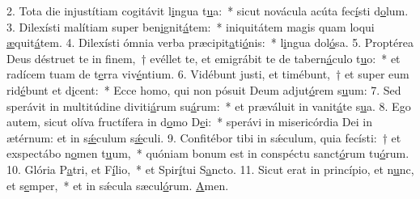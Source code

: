 2. Tota die injustítiam cogitávit l\uline{i}ngua t\uline{u}a:~* sicut novácula acúta fec\uline{í}sti d\uline{o}lum.
3. Dilexísti malítiam super ben\uline{i}gnit\uline{á}tem:~* iniquitátem magis quam loqui \uline{æ}quit\uline{á}tem.
4. Dilexísti ómnia verba præcipit\uline{a}ti\uline{ó}nis:~* l\uline{i}ngua dol\uline{ó}sa.
5. Proptérea Deus déstruet te in finem,~† evéllet te, et emigrábit te de tabern\uline{á}culo t\uline{u}o:~* et radícem tuam de t\uline{e}rra viv\uline{é}ntium.
6. Vidébunt justi, et timébunt,~† et super eum rid\uline{é}bunt et d\uline{i}cent:~* Ecce homo, qui non pósuit Deum adjut\uline{ó}rem s\uline{u}um:
7. Sed sperávit in multitúdine diviti\uline{á}rum su\uline{á}rum:~* et præváluit in vanit\uline{á}te s\uline{u}a.
8. Ego autem, sicut olíva fructífera in d\uline{o}mo D\uline{e}i:~* sperávi in misericórdia Dei in ætérnum: et in s\uline{ǽ}culum s\uline{ǽ}culi.
9. Confitébor tibi in sǽculum, quia fecísti:~† et exspectábo n\uline{o}men t\uline{u}um,~* quóniam bonum est in conspéctu sanct\uline{ó}rum tu\uline{ó}rum.
10. Glória P\uline{a}tri, et F\uline{í}lio,~* et Spir\uline{í}tui S\uline{a}ncto.
11. Sicut erat in princípio, et n\uline{u}nc, et s\uline{e}mper,~* et in sǽcula sæcul\uline{ó}rum. \uline{A}men.
